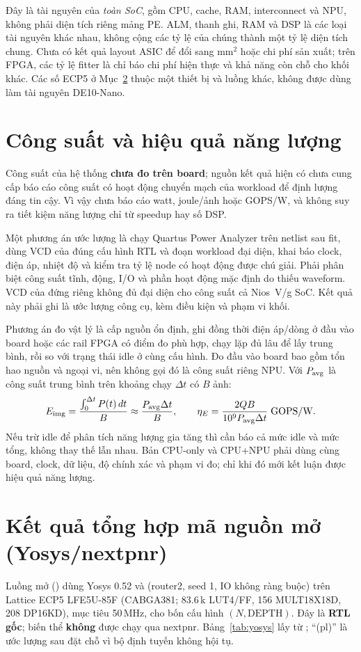 Đây là tài nguyên của \emph{toàn SoC}, gồm CPU, cache, RAM, interconnect và NPU, không phải diện tích riêng mảng PE. ALM, thanh ghi, RAM và DSP là các loại tài nguyên khác nhau, không cộng các tỷ lệ của chúng thành một tỷ lệ diện tích chung. Chưa có kết quả layout ASIC để đổi sang mm$^2$ hoặc chi phí sản xuất; trên FPGA, các tỷ lệ fitter là chỉ báo chi phí hiện thực và khả năng còn chỗ cho khối khác. Các số ECP5 ở Mục~\ref{sec:yosys} thuộc một thiết bị và luồng khác, không được dùng làm tài nguyên DE10-Nano.

\section{Công suất và hiệu quả năng lượng}
\label{sec:power-energy}
Công suất của hệ thống \textbf{chưa đo trên board}; nguồn kết quả hiện có chưa cung cấp báo cáo công suất có hoạt động chuyển mạch của workload để định lượng đáng tin cậy. Vì vậy chưa báo cáo watt, joule/ảnh hoặc GOPS/W, và không suy ra tiết kiệm năng lượng chỉ từ speedup hay số DSP.

Một phương án ước lượng là chạy Quartus Power Analyzer trên netlist sau fit, dùng VCD của đúng cấu hình RTL và đoạn workload đại diện, khai báo clock, điện áp, nhiệt độ và kiểm tra tỷ lệ node có hoạt động được chú giải. Phải phân biệt công suất tĩnh, động, I/O và phần hoạt động mặc định do thiếu waveform. VCD của  đứng riêng không đủ đại diện cho công suất cả Nios~V/g SoC. Kết quả này phải ghi là ước lượng công cụ, kèm điều kiện và phạm vi khối.

Phương án đo vật lý là cấp nguồn ổn định, ghi đồng thời điện áp/dòng ở đầu vào board hoặc các rail FPGA có điểm đo phù hợp, chạy lặp đủ lâu để lấy trung bình, rồi so với trạng thái idle ở cùng cấu hình. Đo đầu vào board bao gồm tổn hao nguồn và ngoại vi, nên không gọi đó là công suất riêng NPU. Với $P_{\rm avg}$ là công suất trung bình trên khoảng chạy $\Delta t$ có $B$ ảnh:
\begin{equation}
 E_{\rm img}=\frac{\int_0^{\Delta t}P(t)\,dt}{B}
 \approx\frac{P_{\rm avg}\Delta t}{B},\qquad
 \eta_E=\frac{2QB}{10^9 P_{\rm avg}\Delta t}\;\text{GOPS/W}.
\end{equation}
Nếu trừ idle để phân tích năng lượng gia tăng thì cần báo cả mức idle và mức tổng, không thay thế lẫn nhau. Bản CPU-only và CPU+NPU phải dùng cùng board, clock, dữ liệu, độ chính xác và phạm vi đo; chỉ khi đó mới kết luận được hiệu quả năng lượng.

\section{Kết quả tổng hợp mã nguồn mở (Yosys/nextpnr)}
\label{sec:yosys}
Luồng mở () dùng Yosys \cite{yosys} 0.52 và  (router2, seed 1, IO không ràng buộc) trên Lattice ECP5 LFE5U-85F (CABGA381; \num{83.6}\,k LUT4/FF, 156 MULT18X18D, 208 DP16KD), mục tiêu 50\,MHz, cho bốn cấu hình $(N,\text{DEPTH})$. Đây là \textbf{RTL gốc}; biến thể  \textbf{không} được chạy qua nextpnr. Bảng~\ref{tab:yosys} lấy từ ; ``(pl)'' là ước lượng sau đặt chỗ vì bộ định tuyến không hội tụ.


